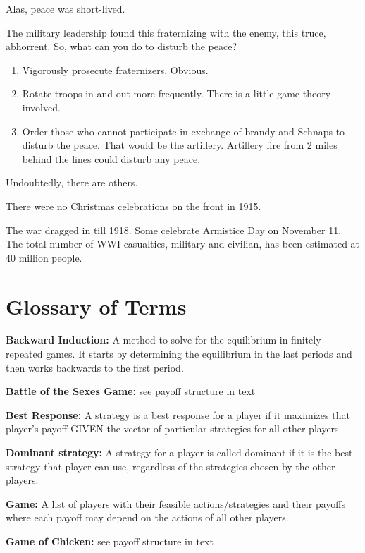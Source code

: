 \documentclass[
]{book}
\providecommand{\tightlist}{%
  \setlength{\itemsep}{0pt}\setlength{\parskip}{0pt}}
\begin{document}
Alas, peace was short-lived.

The military leadership found this fraternizing with the enemy, this truce, abhorrent. So, what can you do to disturb the peace?

\begin{enumerate}
\def\labelenumi{\arabic{enumi}.}
\tightlist
\item
  Vigorously prosecute fraternizers. Obvious.
\item
  Rotate troops in and out more frequently. There is a little game theory involved.
\item
  Order those who cannot participate in exchange of brandy and Schnaps to disturb the peace. That would be the artillery. Artillery fire from 2 miles behind the lines could disturb any peace.
\end{enumerate}

Undoubtedly, there are others.

There were no Christmas celebrations on the front in 1915.

The war dragged in till 1918. Some celebrate Armistice Day on November 11. The total number of WWI casualties, military and civilian, has been estimated at 40 million people.

\hypertarget{glossary-of-terms-8}{%
\section{Glossary of Terms}\label{glossary-of-terms-8}}

\textbf{Backward Induction:} A method to solve for the equilibrium in finitely repeated games. It starts by determining the equilibrium in the last periods and then works backwards to the first period.

\textbf{Battle of the Sexes Game:} see payoff structure in text

\textbf{Best Response:} A strategy is a best response for a player if it maximizes that player's payoff GIVEN the vector of particular strategies for all other players.

\textbf{Dominant strategy:} A strategy for a player is called dominant if it is the best strategy that player can use, regardless of the strategies chosen by the other players.

\textbf{Game:} A list of players with their feasible actions/strategies and their payoffs where each payoff may depend on the actions of all other players.

\textbf{Game of Chicken:} see payoff structure in text
\end{document}
